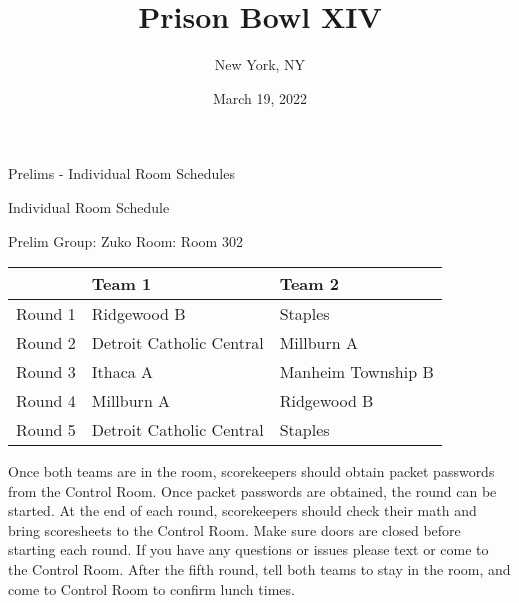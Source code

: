 \documentclass{article}%
\title{Prison Bowl XIV}%
\author{New York, NY}%
\date{March 19, 2022}%
\begin{document}
%
\normalsize%
%
\maketitle%
\vspace*{48pt}%
\begin{center}%
\begin{Huge}%
Prelims {-} Individual Room Schedules%
\end{Huge}%
\end{center}%
\newpage%
\pagestyle{fancy}%
\fancyhf{}%
%
%
%
\begin{center}%
\begin{Huge}%
Individual Room Schedule%
\end{Huge}%
\vspace*{16pt}%
\linebreak%
\begin{Large}%
Prelim Group: Zuko \hfill Room: Room 302%
\end{Large}%
\end{center}%
%
\begin{tabularx}{\textwidth}{|c|Y|Y|}%
\hline%
&Team 1&Team 2\\%
\hline%
Round 1&Ridgewood B&Staples\\%
Round 2&Detroit Catholic Central&Millburn A\\%
Round 3&Ithaca A&Manheim Township B\\%
Round 4&Millburn A&Ridgewood B\\%
Round 5&Detroit Catholic Central&Staples\\%
\hline%
\end{tabularx}%
\vspace*{16pt}%
\linebreak%
Once both teams are in the room, scorekeepers should obtain packet passwords from the Control Room. Once packet passwords are obtained, the round can be started. At the end of each round, scorekeepers should check their math and bring scoresheets to the Control Room.\newline%
\newline%
Make sure doors are closed before starting each round. If you have any questions or issues please text or come to the Control Room.\newline%
\newline%
After the fifth round, tell both teams to stay in the room, and come to Control Room to confirm lunch times.\newline%
\end{document}

